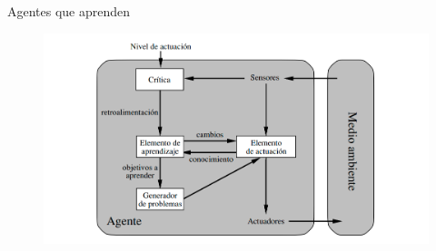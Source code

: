 \begin{frame}{Agentes que aprenden}
    \begin{figure}
        \includegraphics[scale=0.27]{26_chap2_pag26.png}
    \end{figure}
\end{frame}